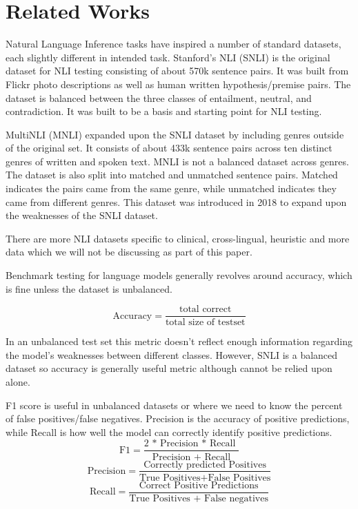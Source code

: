 \documentclass[11pt]{article}
\begin{document}
\section{Related Works}
Natural Language Inference tasks have inspired a number of standard datasets, each slightly different in intended task.  Stanford's NLI (SNLI) is the original dataset for NLI testing consisting of about 570k sentence pairs.  It was built from Flickr photo descriptions as well as human written hypothesis/premise pairs. The dataset is balanced between the three classes of entailment, neutral, and contradiction.  It was built to be a basis and starting point for NLI testing.

MultiNLI (MNLI) expanded upon the SNLI dataset by including genres outside of the original set. It consists of about 433k sentence pairs across ten distinct genres of written and spoken text. MNLI is not a balanced dataset across genres. The dataset is also split into matched and unmatched sentence pairs. Matched indicates the pairs came from the same genre, while unmatched indicates they came from different genres.  This dataset was introduced in 2018 to expand upon the weaknesses of the SNLI dataset. \citealp{williams2018broadcoveragechallengecorpussentence}

There are more NLI datasets specific to clinical, cross-lingual, heuristic and more data which we will not be discussing as part of this paper.

Benchmark testing for language models generally revolves around accuracy, which is fine unless the dataset is unbalanced. 

\begin{equation*}
\text{Accuracy} = \frac{\text{total correct}}{\text{total size of testset}}
\end{equation*}

In an unbalanced test set this metric doesn't reflect enough information regarding the model's weaknesses between different classes. However, SNLI is a balanced dataset so accuracy is generally useful metric although cannot be relied upon alone.

F1 score is useful in unbalanced datasets or where we need to know the percent of false positives/false negatives.  Precision is the accuracy of positive predictions, while Recall is how well the model can correctly identify positive predictions.
\begin{equation*}
\text{F1} = \frac{\text{2 * Precision * Recall }}{\text{Precision + Recall}}
\end{equation*}
\begin{equation*}
\text{Precision} = \frac{\text{Correctly predicted Positives}}{\text{True Positives+False Positives}}
\end{equation*}
\begin{equation*}
\text{Recall} = \frac{\text{Correct Positive Predictions}}{\text{True Positives + False negatives}}
\end{equation*}
\end{document}
